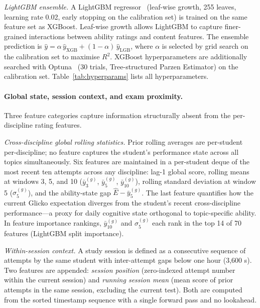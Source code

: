 \documentclass[11pt]{article}
\begin{document}
\textit{LightGBM ensemble.}\quad
A LightGBM regressor~\cite{ke2017} (leaf-wise growth, 255 leaves, learning rate 0.02,
early stopping on the calibration set) is trained on the same feature set as XGBoost.
Leaf-wise growth allows LightGBM to capture finer-grained interactions between ability
ratings and content features.
The ensemble prediction is $\hat{y} = \alpha\,\hat{y}_{\text{XGB}} + (1-\alpha)\,\hat{y}_{\text{LGB}}$,
where $\alpha$ is selected by grid search on the calibration set to maximise $R^2$.
XGBoost hyperparameters are additionally searched with Optuna~\cite{akiba2019} (30 trials,
Tree-structured Parzen Estimator) on the calibration set.
Table~\ref{tab:hyperparams} lists all hyperparameters.

\paragraph{Global state, session context, and exam proximity.}
\label{sec:globalfeatures}
Three feature categories capture information structurally absent from the per-discipline rating features.

\textit{Cross-discipline global rolling statistics.}\quad
Prior rolling averages are per-student per-discipline; no feature captures the student's
performance state across all topics simultaneously.
Six features are maintained in a per-student deque of the most recent ten
attempts across any discipline: lag-1 global score, rolling means at windows 3, 5, and 10
($\bar{y}^{(g)}_3$, $\bar{y}^{(g)}_5$, $\bar{y}^{(g)}_{10}$), rolling standard deviation
at window 5 ($\sigma^{(g)}_5$), and the ability-state gap $\hat{E} - \bar{y}^{(g)}_5$.
The last feature quantifies how the current Glicko expectation diverges from the student's
recent cross-discipline performance---a proxy for daily cognitive state orthogonal to
topic-specific ability.
In feature importance rankings, $\bar{y}^{(g)}_{10}$ and $\sigma^{(g)}_5$ each rank in
the top 14 of 70 features (LightGBM split importance).

\textit{Within-session context.}\quad
A study session is defined as a consecutive sequence of attempts by the same student with
inter-attempt gaps below one hour (3{,}600 s).
Two features are appended: \textit{session position} (zero-indexed attempt number within the
current session) and \textit{running session mean} (mean score of prior attempts in the same
session, excluding the current test).
Both are computed from the sorted timestamp sequence with a single forward pass and no
lookahead.
\end{document}
